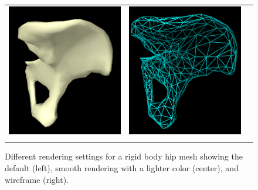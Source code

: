 \begin{figure}[h]
\begin{center}
\begin{tabular}{ccc}
   \includegraphics[width=2in]{images/hipBodySmooth}&
   \includegraphics[width=2in]{images/hipBodyEdges}\\
 \fi
\end{tabular}
\end{center}
\caption{Different rendering settings for a rigid body hip mesh
showing the default (left), smooth rendering with a lighter color
(center), and wireframe (right).}
\label{HipRendering:fig}
\end{figure}

